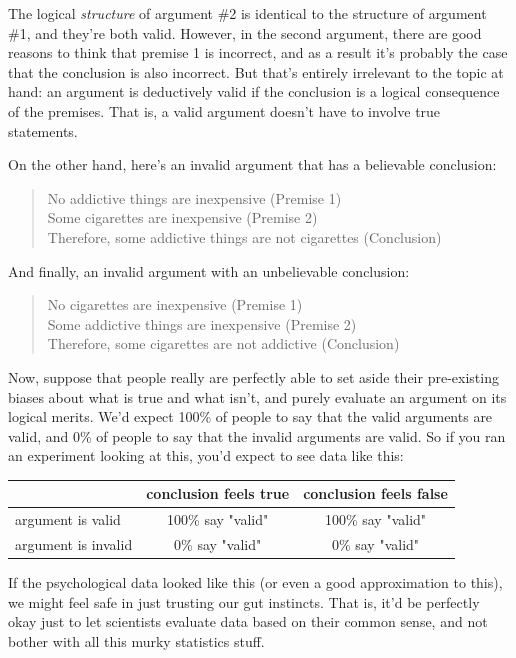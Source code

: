 \documentclass[
  11pt,
]{book}
\theoremstyle{definition}
\theoremstyle{definition}
\theoremstyle{definition}
\theoremstyle{definition}
\theoremstyle{remark}
\begin{document}
The logical \emph{structure} of argument \#2 is identical to the structure of argument \#1, and they're both valid. However, in the second argument, there are good reasons to think that premise 1 is incorrect, and as a result it's probably the case that the conclusion is also incorrect. But that's entirely irrelevant to the topic at hand: an argument is deductively valid if the conclusion is a logical consequence of the premises. That is, a valid argument doesn't have to involve true statements.

On the other hand, here's an invalid argument that has a believable conclusion:

\begin{quote}
No addictive things are inexpensive (Premise 1)\\
Some cigarettes are inexpensive (Premise 2)\\
Therefore, some addictive things are not cigarettes (Conclusion)
\end{quote}

And finally, an invalid argument with an unbelievable conclusion:

\begin{quote}
No cigarettes are inexpensive (Premise 1)\\
Some addictive things are inexpensive (Premise 2)\\
Therefore, some cigarettes are not addictive (Conclusion)
\end{quote}

Now, suppose that people really are perfectly able to set aside their pre-existing biases about what is true and what isn't, and purely evaluate an argument on its logical merits. We'd expect 100\% of people to say that the valid arguments are valid, and 0\% of people to say that the invalid arguments are valid. So if you ran an experiment looking at this, you'd expect to see data like this:

\begin{table}[H]
\centering
\begin{tabular}{lcc}
\toprule
  & conclusion feels true & conclusion feels false\\
\midrule
argument is valid & 100\% say "valid" & 100\% say "valid"\\
argument is invalid & 0\% say "valid" & 0\% say "valid"\\
\bottomrule
\end{tabular}
\end{table}

If the psychological data looked like this (or even a good approximation to this), we might feel safe in just trusting our gut instincts. That is, it'd be perfectly okay just to let scientists evaluate data based on their common sense, and not bother with all this murky statistics stuff.
\end{document}
